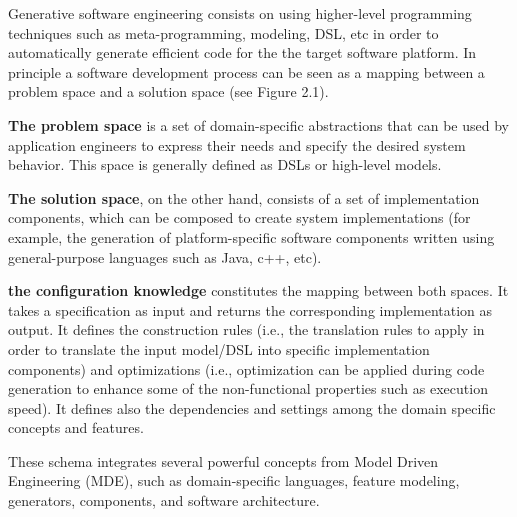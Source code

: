 Generative software engineering consists on using higher-level programming techniques such as meta-programming, modeling, DSL, etc in order to automatically generate efficient code for the the target software platform. 
In principle a software development process can be seen as a mapping between a problem space and a solution space\cite{czarnecki2005overview} (see Figure 2.1). 

\textbf{The problem space} is a set of domain-specific abstractions that can be used by application engineers to express their needs and specify the desired system behavior. This space is generally defined  as DSLs or high-level models. 

\textbf{The solution space}, on the other hand, consists of a set of implementation components, which can be composed to create system implementations (for example, the generation of platform-specific software components written using general-purpose languages such as Java, c++, etc).

\textbf{the configuration knowledge} constitutes the mapping between both spaces. It takes a specification as input and returns the corresponding implementation as output. It defines the construction rules (i.e., the translation rules to apply in order to translate the input model/DSL into specific implementation components) and optimizations (i.e., optimization can be applied during code generation to enhance some of the non-functional properties such as execution speed). It defines also the dependencies and settings among the domain specific concepts and features.


These schema integrates several powerful concepts from Model Driven Engineering (MDE), such as domain-specific languages, feature modeling, generators, components, and software architecture. 

